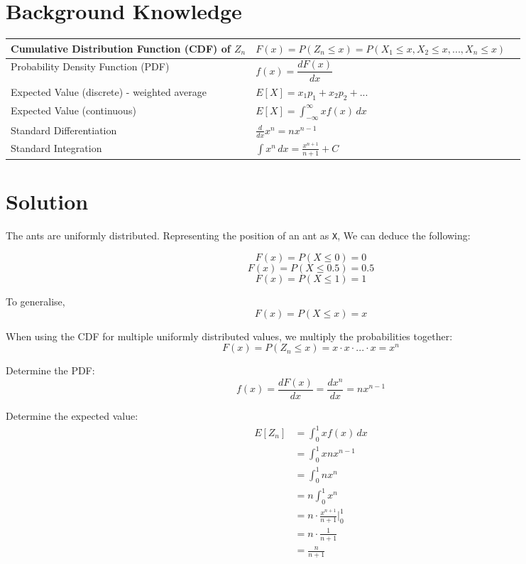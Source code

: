 \documentclass[10pt]{article}
\begin{document}
\newpage

\section{Background Knowledge}
\renewcommand{\arraystretch}{1.5}

\begin{center}
\begin{tabularx}{1\textwidth} { 
  | >{\raggedright\arraybackslash}X 
  | >{\centering\arraybackslash}X 
  | >{\raggedleft\arraybackslash}X | }
 \hline
 Cumulative Distribution Function (CDF) of \texttt{\( Z_n \)} & \( F(x) = P(Z_n \leq x) = P(X_1 \leq x, X_2 \leq x, ..., X_n \leq x)\) \\
 \hline
 Probability Density Function (PDF) & \( f(x) = \dfrac{dF(x)}{dx} \) \\
 \hline
 Expected Value (discrete) - weighted average & \( E[X] = x_1p_1 + x_2p_2 + ... \) \\
 \hline
 Expected Value (continuous) & \( E[X] = \int_{-\infty}^{\infty} xf(x) \,dx\) \\
 \hline
 Standard Differentiation & \( \frac{d}{dx} x^n = nx^{n-1} \) \\
 \hline
 Standard Integration & \( \int x^n \,dx = \frac{x^{n+1}}{n+1} + C \) \\
 \hline
\end{tabularx}
\end{center}

\section{Solution}

The ants are uniformly distributed. Representing the position of an ant as \texttt{X}, We can deduce the following:

\[ F(x) = P(X \leq 0) = 0 \]
\[ F(x) = P(X \leq 0.5) = 0.5 \]
\[ F(x) = P(X \leq 1) = 1 \]

To generalise,
\[ F(x) = P(X \leq x) = x \]

When using the CDF for multiple uniformly distributed values, we multiply the probabilities together:
\[ F(x) = P(Z_n \leq x) = x \cdot x \cdot ... \cdot x = x^n \]

Determine the PDF:
\[ f(x) = \dfrac{dF(x)}{dx} = \dfrac{dx^n}{dx} = nx^{n-1} \]

Determine the expected value:
\begin{align*}
  E[Z_n] &= \int_{0}^{1} xf(x) \,dx \\
  &= \int_{0}^{1} xnx^{n-1} \\
  &= \int_{0}^{1} nx^n \\
  &= n\int_{0}^{1} x^n \\
  &= n \cdot \frac{x^{n+1}}{n+1}\biggr\rvert_0^1 \\
  &= n \cdot \frac{1}{n+1} \\
  &= \frac{n}{n+1}
\end{align*}
\end{document}
